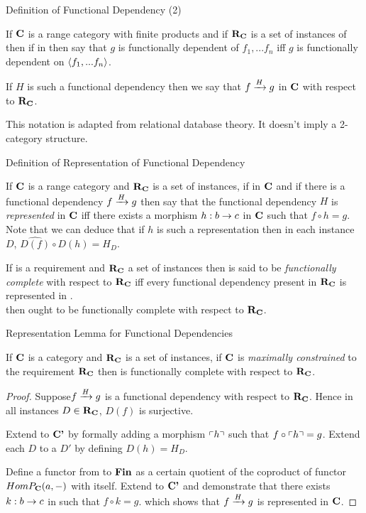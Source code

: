 \begin{frame}{Definition of Functional Dependency (2)}
\begin{definition}
If $\catc$ is a range category with finite products and if $\reqtc$ is a set of instances 
of \catcw then if 
in \catcw then say that $g$ is functionally dependent of $f_1,...f_n$
iff $g$ is functionally dependent on $\fntuple$.
\end{definition}
\pause If $H$ is such a functional dependency then we say that $\fundep{H}{f}{g}$ in $\catc$ with respect to $\reqtc$. 

This notation is adapted  from relational database theory. It doesn't imply a 2-category structure.
\end{frame}


\begin{frame}{Definition of Representation of Functional Dependency}
\begin{definition}
If $\catc$ is a range category and $\reqtc$ is a set of instances, if
\fgsourcediag
in $\catc$ 
and if there is a functional dependency $\fundep{H}{f}{g}$ then say that 
the functional dependency $H$ is \textit{represented} in $\catc$ 
iff there exists a morphism $h:b \morph c$ in $\catc$ such that 
$f \circ h = g$. Note that we can deduce that if $h$ is such a representation then
in each instance $D$, $\widehat{D(f)} \circ D(h) = H_D$.
\end{definition}
\medskip
\pause If \catcw is a requirement and $\reqtc$ a set of instances then \catcw is said to be 
\textit{functionally complete} with respect to $\reqtc$ iff every functional dependency
present in $\reqtc$ is represented in \catc.\\
\medskip
\pause {}\IfSforCwithRCwords then \catcw ought to be functionally complete with respect to $\reqtc$.
\end{frame}


\begin{frame}{Representation Lemma for Functional Dependencies}
\begin{lemma}
If $\catc$ is a \datacat category and $\reqtc$ is a set of instances, if $\catc$ is 
\textit{maximally constrained} to the requirement $\reqtc$ then 
\catcw is functionally complete with respect to $\reqtc$.
\end{lemma}
\begin{proof}
Suppose$\fundep{H}{f}{g}$  is a functional dependency with respect to $\reqtc$.
Hence in all instances $D \in \reqtc$, $D(f)$ is surjective.

Extend \catcw to $\catcp$ by formally adding a morphism $\qq{h}$ such that $f \circ \qq{h}=g$. Extend each $D$ to a $D'$ by defining $D(h)=H_D$. 

Define a functor from \catcw to $\Fin$ as  a certain quotient of the coproduct of functor $HomP_{\catc}(a,-)$ with itself. 
Extend to $\catcp$ and demonstrate that there exists $k:b \morph c$ in \catcw such that $f \circ k=g$. 
which shows that $\fundep{H}{f}{g}$ is represented in $\catc$.
\end{proof}
\end{frame}



